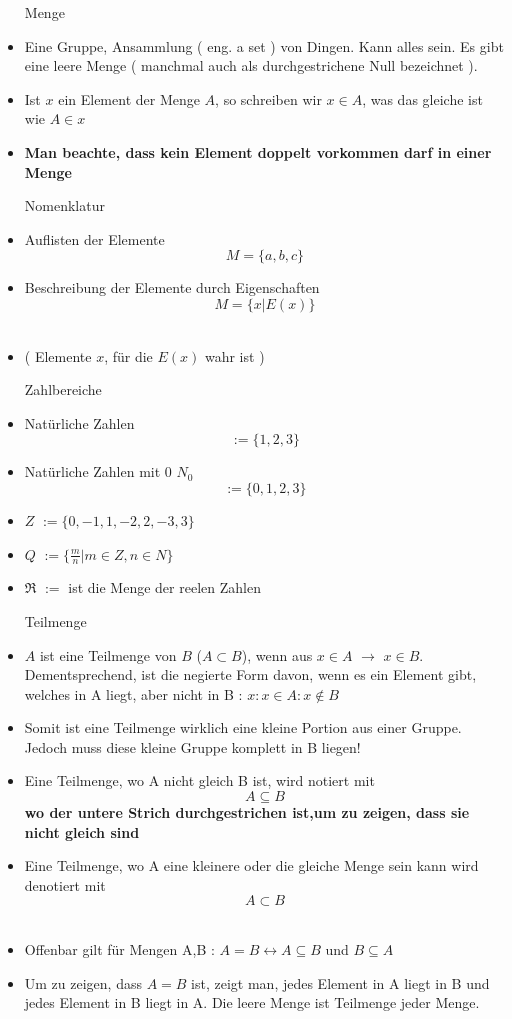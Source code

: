 \documentclass[smallheadings,headsepline,12pt,a4paper]{scrartcl}
\begin{document}
\begin{itemize}

\item[Menge]
\item Eine Gruppe, Ansammlung ( eng. a set ) von Dingen. Kann alles sein. Es gibt eine leere Menge {} ( manchmal auch als durchgestrichene Null bezeichnet ). \\
\item Ist $x$ ein Element der Menge $A$, so schreiben wir $x \in A$, was das gleiche ist wie $ A \in x $
\item \textbf{ Man beachte, dass kein Element doppelt vorkommen darf in einer Menge}


\item[Nomenklatur]
\item Auflisten der Elemente $$ M= \{a,b,c\} $$
\item Beschreibung der Elemente durch Eigenschaften 
$$ M= \{ x|E(x) \} $$ \\
\item ( Elemente $x$, für die $E(x)$ wahr ist ) 


\item[Zahlbereiche]
\item Natürliche Zahlen $$ := \{1,2,3\} $$
\item Natürliche Zahlen mit 0 $N_0$ $$ := \{0,1,2,3\} $$
\item $Z$ $:= \{0,-1,1,-2,2,-3,3\}$ 
\item $Q$ $:= \{\frac{m}{n}| m\in Z , n \in N \}$
\item $\Re$ $:=$ ist die Menge der reelen Zahlen \\

\item[Teilmenge]
\item $A$ ist eine Teilmenge von $B$ ($A \subset B $), wenn aus $ x \in  A $ $\rightarrow$ $ x \in B $. Dementsprechend, ist die negierte Form davon, wenn es ein Element gibt, welches in A liegt, aber nicht in B : $ x : x \in A : x \not \in B$ \\
\item Somit ist eine Teilmenge wirklich eine kleine Portion aus einer Gruppe. Jedoch muss diese kleine Gruppe komplett in B liegen!
\item Eine Teilmenge, wo A nicht gleich B ist, wird notiert mit $$ A \subseteq B $$ \textbf{wo der untere Strich durchgestrichen ist,um zu zeigen, dass sie nicht gleich sind}
\item Eine Teilmenge, wo A eine kleinere oder die gleiche Menge sein kann wird denotiert mit $$ A \subset B $$  \\
\item Offenbar gilt für Mengen A,B : $ A = B \leftrightarrow A \subseteq B $ und $ B \subseteq A $
\item Um zu zeigen, dass $ A = B $ ist, zeigt man, jedes Element in A liegt in B und jedes Element in B liegt in A. Die leere Menge ist Teilmenge jeder Menge.\\



\end{itemize}
\end{document}
